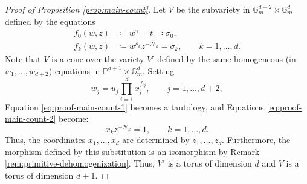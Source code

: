 \documentclass[10pt,a4paper]{amsart}
\newcommand{\G}{\mathbb{G}}
\newcommand{\Ps}{\mathbb{P}}
\begin{document}
\begin{proof}[Proof of Proposition \ref{prop:main-count}]
Let $V$ be the subvariety in $\G_m^{d+2} \times \G_m^d$ defined by the equations
\begin{align}
f_0(w,z)&\coloneqq w^{\gamma} =t\eqqcolon \sigma_0, \label{eq:proof-main-count-1}\\
f_k(w,z)&\coloneqq w^{\rho_k} z^{-\mathcal{N}_k}=  \sigma_k, \qquad k=1,\dots,d.\label{eq:proof-main-count-2}
\end{align}
Note that $V$ is a cone over the variety $V'$ defined by the same homogeneous (in $w_1, \dots, w_{d+2}$) equations in $\Ps^{d+1} \times \G_m^d$. Setting 
\[
w_j = u_j \prod_{i=1}^{d} x_i^{f_{ij}}, \qquad j=1,\dots,d+2,
\]
Equation \eqref{eq:proof-main-count-1} becomes a tautology, and Equations \eqref{eq:proof-main-count-2} become:
\[
x_k z^{-\mathcal{N}_k}=  1, \qquad k=1,\dots,d.
\]
Thus, the coordinates $x_1,\dots,x_d$ are determined by $z_1,\dots,z_d$. Furthermore, the morphism defined by this substitution is an isomorphism by Remark \ref{rem:primitive-dehomogenization}. 
Thus, $V'$ is a torus of dimension $d$ and $V$ is a torus of dimension $d+1$.


\end{proof}
\end{document}
